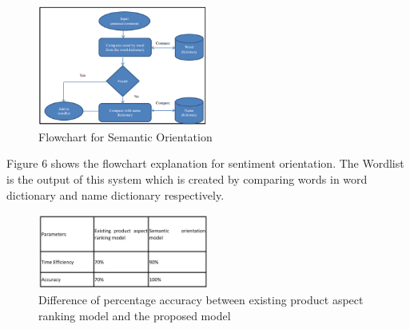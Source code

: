 \documentclass[conference]{IEEEtran}
\begin{document}
\begin{figure}[!ht]
	\centering
	\includegraphics[width=0.5\textwidth]{SO.png}
	\caption{Flowchart for Semantic Orientation}
\end{figure}
Figure 6 shows the flowchart explanation for sentiment orientation. The Wordlist is the output of this system which is created by comparing words in word dictionary and name dictionary respectively.
\begin{figure}[!ht]
	\centering
	\includegraphics[width=0.5\textwidth]{table2-1.jpg}
	\caption{Difference of percentage accuracy between existing product aspect ranking model and the proposed model }
\end{figure}
\end{document}
